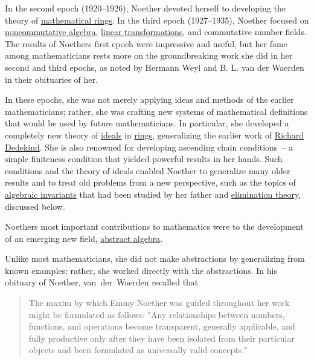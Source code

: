 In the second epoch (1920--1926), Noether devoted herself to developing the theory of \href{https://en.wikipedia.org/wiki/Ring_(mathematics)}{mathematical rings}. In the third epoch (1927--1935), Noether focused on \href{https://en.wikipedia.org/wiki/Noncommutative_algebra}{noncommutative algebra}, \href{https://en.wikipedia.org/wiki/Linear_transformations}{linear transformations}, and commutative number fields. The results of Noether\textquotesingle s first epoch were impressive and useful, but her fame among mathematicians rests more on the groundbreaking work she did in her second and third epochs, as noted by Hermann Weyl and B. L. van der Waerden in their obituaries of her.

In these epochs, she was not merely applying ideas and methods of the earlier mathematicians; rather, she was crafting new systems of mathematical definitions that would be used by future mathematicians. In particular, she developed a completely new theory of \href{https://en.wikipedia.org/wiki/Ideal_(ring_theory)}{ideals} in \href{https://en.wikipedia.org/wiki/Ring_(mathematics)}{rings}, generalizing the earlier work of \href{https://en.wikipedia.org/wiki/Richard_Dedekind}{Richard Dedekind}. She is also renowned for developing ascending chain conditions{~}{--}{ }a simple finiteness condition that yielded powerful results in her hands. Such conditions and the theory of ideals enabled Noether to generalize many older results and to treat old problems from a new perspective, such as the topics of \href{https://en.wikipedia.org/wiki/Algebraic_invariant}{algebraic invariants} that had been studied by her father and \href{https://en.wikipedia.org/wiki/Elimination_theory}{elimination theory}, discussed below.

Noether\textquotesingle s most important contributions to mathematics were to the development of an emerging new field, \href{https://en.wikipedia.org/wiki/Abstract_algebra}{abstract algebra}.

Unlike most mathematicians, she did not make abstractions by generalizing from known examples; rather, she worked directly with the abstractions. In his obituary of Noether, van{~}der{~}Waerden recalled that

\begin{quote}
The maxim by which Emmy Noether was guided throughout her work might be formulated as follows: "Any relationships between numbers, functions, and operations become transparent, generally applicable, and fully productive only after they have been isolated from their particular objects and been formulated as universally valid concepts."
\end{quote}

